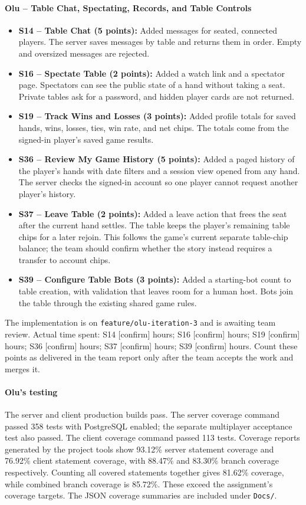 \paragraph{Olu -- Table Chat, Spectating, Records, and Table Controls}
\begin{itemize}
    \item \textbf{S14 -- Table Chat (5 points):} Added messages for seated, connected players. The server saves messages by table and returns them in order. Empty and oversized messages are rejected.
    \item \textbf{S16 -- Spectate Table (2 points):} Added a watch link and a spectator page. Spectators can see the public state of a hand without taking a seat. Private tables ask for a password, and hidden player cards are not returned.
    \item \textbf{S19 -- Track Wins and Losses (3 points):} Added profile totals for saved hands, wins, losses, ties, win rate, and net chips. The totals come from the signed-in player's saved game results.
    \item \textbf{S36 -- Review My Game History (5 points):} Added a paged history of the player's hands with date filters and a session view opened from any hand. The server checks the signed-in account so one player cannot request another player's history.
    \item \textbf{S37 -- Leave Table (2 points):} Added a leave action that frees the seat after the current hand settles. The table keeps the player's remaining table chips for a later rejoin. This follows the game's current separate table-chip balance; the team should confirm whether the story instead requires a transfer to account chips.
    \item \textbf{S39 -- Configure Table Bots (3 points):} Added a starting-bot count to table creation, with validation that leaves room for a human host. Bots join the table through the existing shared game rules.
\end{itemize}
The implementation is on \texttt{feature/olu-iteration-3} and is awaiting team review. Actual time spent: S14 [confirm] hours; S16 [confirm] hours; S19 [confirm] hours; S36 [confirm] hours; S37 [confirm] hours; S39 [confirm] hours. Count these points as delivered in the team report only after the team accepts the work and merges it.

\paragraph{Olu's testing}
The server and client production builds pass. The server coverage command passed 358 tests with PostgreSQL enabled; the separate multiplayer acceptance test also passed. The client coverage command passed 113 tests. Coverage reports generated by the project tools show 93.12\% server statement coverage and 76.92\% client statement coverage, with 88.47\% and 83.30\% branch coverage respectively. Counting all covered statements together gives 81.62\% coverage, while combined branch coverage is 85.72\%. These exceed the assignment's coverage targets. The JSON coverage summaries are included under \texttt{Docs/}.

